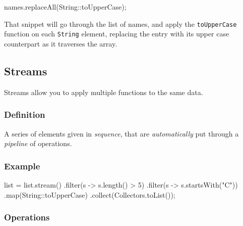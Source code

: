 \documentclass[]{article}
\newenvironment{Shaded}{}{}
\newcommand{\BuiltInTok}[1]{#1}
\newcommand{\DecValTok}[1]{\textcolor[rgb]{0.25,0.63,0.44}{#1}}
\newcommand{\FunctionTok}[1]{\textcolor[rgb]{0.02,0.16,0.49}{#1}}
\newcommand{\NormalTok}[1]{#1}
\newcommand{\StringTok}[1]{\textcolor[rgb]{0.25,0.44,0.63}{#1}}
\begin{document}
\begin{Shaded}
\begin{Highlighting}[]
\NormalTok{names.}\FunctionTok{replaceAll}\NormalTok{(}\BuiltInTok{String}\NormalTok{::toUpperCase);}
\end{Highlighting}
\end{Shaded}

That snippet will go through the list of names, and apply the
\texttt{toUpperCase} function on each \texttt{String} element, replacing
the entry with its upper case counterpart as it traverses the array.

\hypertarget{streams}{%
\subsection{Streams}\label{streams}}

Streams allow you to apply multiple functions to the same data.

\hypertarget{definition-3}{%
\subsubsection{Definition}\label{definition-3}}

A series of elements given in \emph{sequence}, that are
\emph{automatically} put through a \emph{pipeline} of operations.

\hypertarget{example-1}{%
\subsubsection{Example}\label{example-1}}

\begin{Shaded}
\begin{Highlighting}[]
\NormalTok{list = list.}\FunctionTok{stream}\NormalTok{()}
\NormalTok{           .}\FunctionTok{filter}\NormalTok{(s -> s.}\FunctionTok{length}\NormalTok{() > }\DecValTok{5}\NormalTok{)}
\NormalTok{           .}\FunctionTok{filter}\NormalTok{(s -> s.}\FunctionTok{startsWith}\NormalTok{(}\StringTok{"C"}\NormalTok{))}
\NormalTok{           .}\FunctionTok{map}\NormalTok{(}\BuiltInTok{String}\NormalTok{::toUpperCase)}
\NormalTok{           .}\FunctionTok{collect}\NormalTok{(Collectors.}\FunctionTok{toList}\NormalTok{());}
\end{Highlighting}
\end{Shaded}

\hypertarget{operations-1}{%
\subsubsection{Operations}\label{operations-1}}
\end{document}
